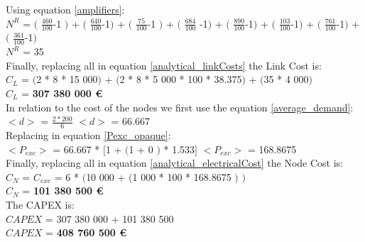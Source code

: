 Using equation \ref{amplifiers}:\\

$N^R$ = $($ $\frac{460}{100}$-1 $)$ + $($ $\frac{640}{100}$-1$)$ + $($ $\frac{75}{100}$-1 $)$ + $($ $\frac{684}{100}$ -1$)$ + $($ $\frac{890}{100}$-1$)$ + $($ $\frac{103}{100}$-1$)$ + $($ $\frac{761}{100}$-1$)$ + $($ $\frac{361}{100}$-1$)$\\

$N^R$ = 35\\

Finally, replacing all in equation \ref{analytical_linkCosts} the Link Cost is:\\

$C_L$ = $($2 * 8 * 15 000$)$ + $($2 * 8 * 5 000 * 100 * 38.375$)$ + $($35 * 4 000$)$\\

$C_L$ = \textbf{307 380 000 \euro}\\

In relation to the cost of the nodes we first use the equation \ref{average_demand}:\\

$<d>$ = $\frac{2 * 200}{6}$ \qquad \qquad $<d>$ = 66.667\\

Replacing in equation \ref{Pexc_opaque}:\\

$<P_{exc}>$ = 66.667 * $[$1 + $($1 + $0$ $)$ * 1.533$]$ \qquad \qquad $<P_{exc}>$ = 168.8675 \\

Finally, replacing all in equation \ref{analytical_electricalCost} the Node Cost is:\\

$C_N$ = $C_{exc}$ = 6 * $($10 000 + $($1 000 * 100 * 168.8675 $)$ $)$\\

$C_N$ = \textbf{101 380 500 \euro}\\

The CAPEX is:\\
$CAPEX$ = 307 380 000 + 101 380 500\\

$CAPEX$ = \textbf{408 760 500 \euro}\\

